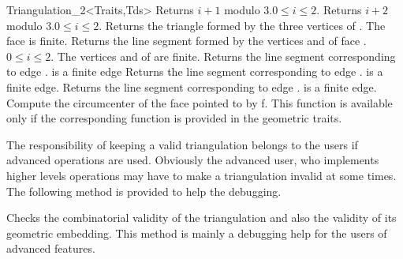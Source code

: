 \begin{ccRefClass}{Triangulation_2<Traits,Tds>}
{Returns $i+1$ modulo 3.\ccPrecond $0\leq i \leq 2$.}
\ccGlue
{}
{Returns $i+2$ modulo 3.\ccPrecond $0\leq i \leq 2$.}
\ccGlue
{}
{Returns the triangle formed by the three vertices of .
 \ccPrecond The face is finite.}
\ccGlue
{}
{Returns the line segment formed by the vertices 
 and  of face .
\ccPrecond $0\leq i \leq 2$. The vertices 
 and  of  
 are finite.}
\ccGlue
{}
{Returns the line segment corresponding to edge .
\ccPrecond {} is a finite edge}
\ccGlue
{}
{Returns the line segment corresponding to edge .
\ccPrecond {} is a finite edge.}
\ccGlue
{}
{Returns the line segment corresponding to edge .
\ccPrecond {} is a finite edge.}
\ccGlue
{}
{Compute the circumcenter of the face pointed to by f. This function
is available only if the corresponding function is provided in the
geometric traits.}

\begin{ccAdvanced}

The responsibility of keeping a valid triangulation
belongs to the users if advanced operations are used.
Obviously the advanced user, who implements higher levels operations
may have to make a triangulation invalid at some times. The following
method is provided to help the debugging.

{Checks the combinatorial validity of the triangulation and
also the validity of its geometric embedding.
 This method is  mainly a debugging help
for the users of advanced features.
}
\end{ccAdvanced}



\end{ccRefClass}
